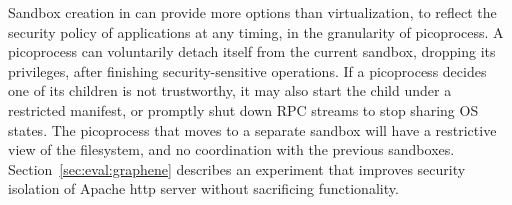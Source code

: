 

Sandbox creation in \graphene{} can provide
more options than virtualization, to reflect the security policy of applications at any timing,
in the granularity of picoprocess. 
A picoprocess can voluntarily detach itself from the current sandbox, dropping its privileges,
after finishing security-sensitive operations.
If a picoprocess decides one of its children is not trustworthy, it may also start the child under a restricted manifest,
or promptly shut down RPC streams to stop sharing OS states.
The picoprocess that moves to a separate sandbox will have a restrictive view of the filesystem, and no coordination with the previous sandboxes.
Section~\ref{sec:eval:graphene} describes an experiment that improves security isolation of Apache http server without sacrificing functionality.



